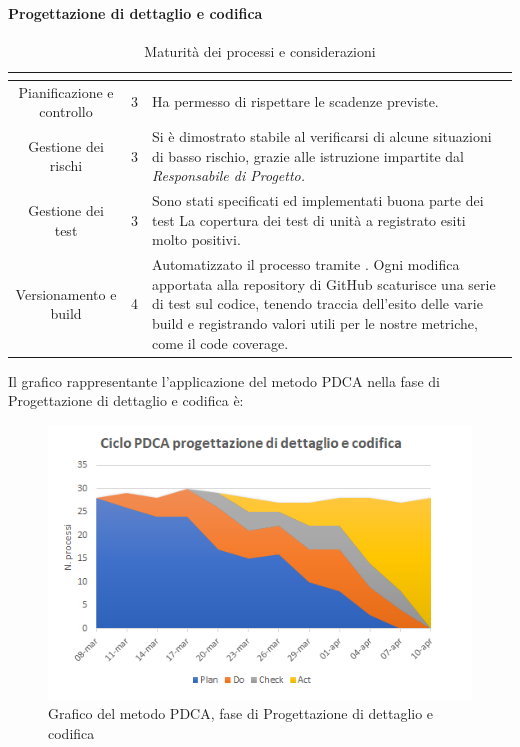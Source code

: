 \paragraph{Progettazione di dettaglio e codifica} \Spazio
\renewcommand{\arraystretch}{1.5}
\begin{table}[H]
	\begin{center}
		\begin{tabular}{|c|c|p{6.8cm}|}
			\hline
			\rowcolor{title_row}
			\textbf{\color{title_text}{Processo}} & \textbf{\color{title_text}{Livello di maturità}} & \textbf{\color{title_text}{Considerazioni}} \\
			\hline
			{Pianificazione e controllo} & {3} & {Ha permesso di rispettare le scadenze previste.}\\	
			\hline
			{Gestione dei rischi} & {3} & {Si è dimostrato stabile al verificarsi di alcune situazioni di basso rischio, grazie alle istruzione impartite dal \emph{Responsabile di Progetto.}}\\	
			\hline
			{Gestione dei test} & {3} & {Sono stati specificati ed implementati buona parte dei test La copertura dei test di unità a registrato esiti molto positivi.}\\	
			\hline
			{Versionamento e build} & {4} & {Automatizzato il processo tramite \gl{Travis}.} Ogni modifica apportata alla repository di GitHub scaturisce una serie di test sul codice, tenendo traccia dell'esito delle varie build e registrando valori utili per le nostre metriche, come il code coverage.\\	
			\hline
		\end{tabular}
		\caption[Maturità dei processi, Progettazione di dettaglio e codifica]{Maturità dei processi e considerazioni}	
		\label{tabella: considerazioni sulla maturità dei processi raggiunta rq}
	\end{center}
\end{table}
\renewcommand{\arraystretch}{1}
Il grafico rappresentante l'applicazione del metodo PDCA nella fase di Progettazione di dettaglio e codifica è:
\begin{figure} [H]
	\centering
	\includegraphics[scale=1]{Img/Ciclo_PDCA_progettazione_dettaglio}
	\caption{Grafico del metodo PDCA, fase di Progettazione di dettaglio e codifica}\label{}
\end{figure}
